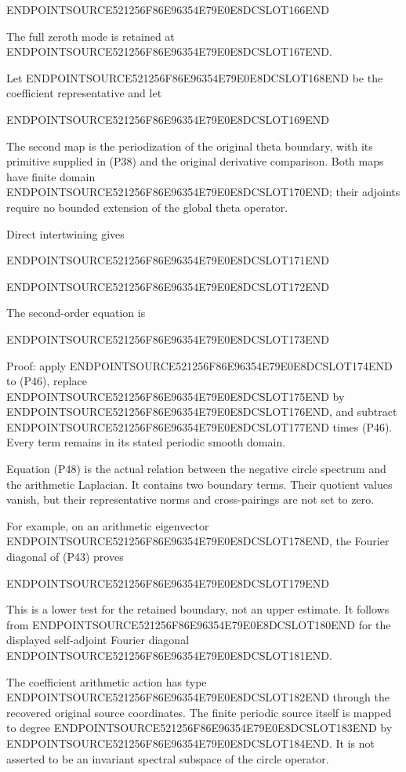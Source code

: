 ENDPOINTSOURCE521256F86E96354E79E0E8DCSLOT166END

The full zeroth mode is retained at ENDPOINTSOURCE521256F86E96354E79E0E8DCSLOT167END.

Let ENDPOINTSOURCE521256F86E96354E79E0E8DCSLOT168END be the coefficient representative and let

ENDPOINTSOURCE521256F86E96354E79E0E8DCSLOT169END

The second map is the periodization of the original theta boundary, with its primitive supplied in (P38) and the original derivative comparison. Both maps have finite domain ENDPOINTSOURCE521256F86E96354E79E0E8DCSLOT170END; their adjoints require no bounded extension of the global theta operator.

Direct intertwining gives

ENDPOINTSOURCE521256F86E96354E79E0E8DCSLOT171END

ENDPOINTSOURCE521256F86E96354E79E0E8DCSLOT172END

The second-order equation is

ENDPOINTSOURCE521256F86E96354E79E0E8DCSLOT173END

Proof: apply ENDPOINTSOURCE521256F86E96354E79E0E8DCSLOT174END to (P46), replace ENDPOINTSOURCE521256F86E96354E79E0E8DCSLOT175END by ENDPOINTSOURCE521256F86E96354E79E0E8DCSLOT176END, and subtract ENDPOINTSOURCE521256F86E96354E79E0E8DCSLOT177END times (P46). Every term remains in its stated periodic smooth domain.

Equation (P48) is the actual relation between the negative circle spectrum and the arithmetic Laplacian. It contains two boundary terms. Their quotient values vanish, but their representative norms and cross-pairings are not set to zero.

For example, on an arithmetic eigenvector ENDPOINTSOURCE521256F86E96354E79E0E8DCSLOT178END, the Fourier diagonal of (P43) proves

ENDPOINTSOURCE521256F86E96354E79E0E8DCSLOT179END

This is a lower test for the retained boundary, not an upper estimate. It follows from ENDPOINTSOURCE521256F86E96354E79E0E8DCSLOT180END for the displayed self-adjoint Fourier diagonal ENDPOINTSOURCE521256F86E96354E79E0E8DCSLOT181END.

The coefficient arithmetic action has type ENDPOINTSOURCE521256F86E96354E79E0E8DCSLOT182END through the recovered original source coordinates. The finite periodic source itself is mapped to degree ENDPOINTSOURCE521256F86E96354E79E0E8DCSLOT183END by ENDPOINTSOURCE521256F86E96354E79E0E8DCSLOT184END. It is not asserted to be an invariant spectral subspace of the circle operator.

